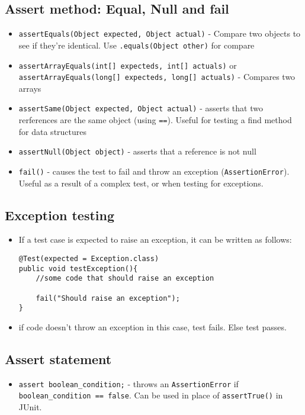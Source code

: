 \documentclass[12pt]{book}
\begin{document}
\subsection{Assert method: Equal, Null and fail}

\begin{itemize}
    \item \texttt{assertEquals(Object expected, Object actual)} - Compare two objects to see if they're identical. Use \texttt{.equals(Object other)} for compare
    \item \texttt{assertArrayEquals(int[] expecteds, int[] actuals)} or \texttt{assertArrayEquals(long[] expecteds, long[] actuals)} - Compares two arrays
    \item \texttt{assertSame(Object expected, Object actual)} - asserts that two rerferences are the same object (using \texttt{==}). Useful for testing a find method for data structures
    \item \texttt{assertNull(Object object)} - asserts that a reference is not null
    \item \texttt{fail()} - causes the test to fail and throw an exception (\texttt{AssertionError}). Useful as a result of a complex test, or when testing for exceptions.
\end{itemize}

\subsection{Exception testing}

\begin{itemize}
    \item If a test case is expected to raise an exception, it can be written as follows:
\begin{lstlisting}
@Test(expected = Exception.class)
public void testException(){
    //some code that should raise an exception

    fail("Should raise an exception");
}
\end{lstlisting}

    \item if code doesn't throw an exception in this case, test fails. Else test passes.
\end{itemize}

\subsection{Assert statement}

\begin{itemize}
    \item \texttt{assert boolean\_condition;} - throws an \texttt{AssertionError} if \texttt{boolean\_condition == false}. Can be used in place of \texttt{assertTrue()} in JUnit.
\end{itemize}
\end{document}
